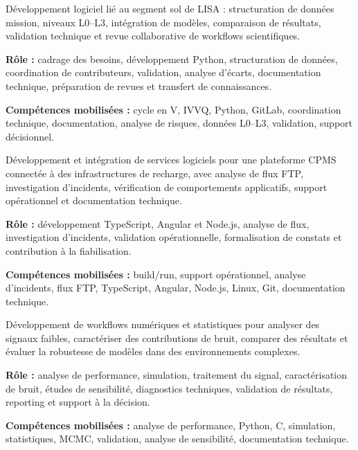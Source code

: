 \documentclass[8pt,a4paper,ragged2e,withhyper]{altacv}
\begin{document}
Développement logiciel lié au segment sol de LISA : structuration de données mission, niveaux L0--L3, intégration de modèles, comparaison de résultats, validation technique et revue collaborative de workflows scientifiques.

\textbf{Rôle :} cadrage des besoins, développement Python, structuration de données, coordination de contributeurs, validation, analyse d’écarts, documentation technique, préparation de revues et transfert de connaissances.

\textbf{Compétences mobilisées :} cycle en V, IVVQ, Python, GitLab, coordination technique, documentation, analyse de risques, données L0--L3, validation, support décisionnel.

\divider


Développement et intégration de services logiciels pour une plateforme CPMS connectée à des infrastructures de recharge, avec analyse de flux FTP, investigation d’incidents, vérification de comportements applicatifs, support opérationnel et documentation technique.

\textbf{Rôle :} développement TypeScript, Angular et Node.js, analyse de flux, investigation d’incidents, validation opérationnelle, formalisation de constats et contribution à la fiabilisation.

\textbf{Compétences mobilisées :} build/run, support opérationnel, analyse d’incidents, flux FTP, TypeScript, Angular, Node.js, Linux, Git, documentation technique.

\divider


Développement de workflows numériques et statistiques pour analyser des signaux faibles, caractériser des contributions de bruit, comparer des résultats et évaluer la robustesse de modèles dans des environnements complexes.

\textbf{Rôle :} analyse de performance, simulation, traitement du signal, caractérisation de bruit, études de sensibilité, diagnostics techniques, validation de résultats, reporting et support à la décision.

\textbf{Compétences mobilisées :} analyse de performance, Python, C, simulation, statistiques, MCMC, validation, analyse de sensibilité, documentation technique.
\end{document}
